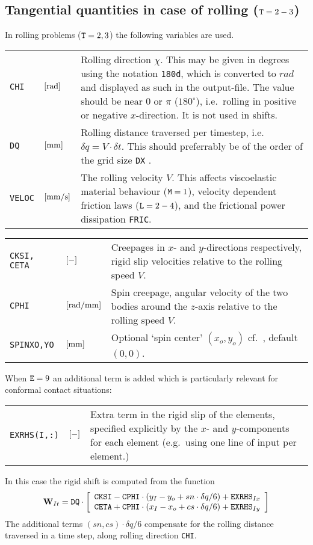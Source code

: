\documentclass[12pt]{report}
\newenvironment{inputvars}{\vspace{0.4\baselineskip}%

\begin{tabular}{>{\raggedright}p{22mm}p{19mm}p{113mm}}}{
\end{tabular}

}
\newcommand{\inpvar}[3]{{\small\tt #1} & $#2$ & #3 \\[1ex]}
\newcommand{\inpbreak}{\end{inputvars}\begin{inputvars}}
\begin{document}
\subsection{Tangential quantities in case of rolling \texorpdfstring{(${\tt
        T}=2-3$)}{}}
\label{sec:kincns_roll}

In rolling problems (${\tt T}=2,3$) the following variables are used.
\begin{inputvars}
\inpvar{CHI}{\bunit{rad}}{Rolling direction $\chi$. This may be given in
        degrees using the notation {\tt 180d}, which is converted to
        $\unit{rad}$ and displayed as such in the output-file. The value
        should be near $0$ or $\pi$ ($180^\circ$), i.e.\ rolling in
        positive or negative $x$-direction. It is not used in shifts.}
\inpvar{DQ}{\bunit{mm}}{Rolling distance traversed per timestep, i.e.\
        $\delta q=V\cdot\delta t$. This should preferrably be of the
        order of the grid size {\tt DX} \cite{Wekken2017a-wiggles}.}
\inpvar{VELOC}{\bunit{mm/s}}{The rolling velocity $V$. This affects
        viscoelastic material behaviour (${\tt M}=1$), velocity dependent
        friction laws (${\tt L}=2-4$), and the frictional power dissipation
        {\tt FRIC}.}
\inpbreak
\inpvar{CKSI, CETA}{\bunit{-}}{Creepages in $x$- and $y$-directions
        respectively, rigid slip velocities relative to the rolling speed
        $V$.}
\inpvar{CPHI}{\bunit{rad/mm}}{Spin creepage, angular velocity of the two
        bodies around the $z$-axis relative to the rolling speed $V$.}
\inpvar{SPINXO,YO}{\bunit{mm}}{Optional `spin center' $(x_o,y_o)$ cf.\
        \cite{Vollebregt2018a-sdec}, default $(0,0)$.}
\end{inputvars}
When ${\tt E}=9$ an additional term is added which is particularly relevant
for conformal contact situations:
\begin{inputvars}
\inpvar{EXRHS(I,:)}{\bunit{-}}{Extra term in the rigid slip of the elements,
        specified explicitly by the $x$- and $y$-components for each
        element (e.g.\ using one line of input per element.)}
\end{inputvars}
In this case the rigid shift is computed from the function
\begin{equation}\label{eq:rig_shift_roll}
 \vec{W}_{It} = {\tt DQ} \cdot \left[
        \begin{array}{l}
        {\tt CKSI} - {\tt CPHI} \cdot (y_I-y_o+sn\cdot\delta q/6)
                + {\tt EXRHS}_{Ix}  \\
        {\tt CETA} + {\tt CPHI} \cdot (x_I-x_o+cs\cdot\delta q/6)
                + {\tt EXRHS}_{Iy}
        \end{array} \right]
\end{equation}
The additional terms $(sn,cs)\cdot\delta q/6$ compensate for the rolling
distance traversed in a time step, along rolling direction {\tt CHI}.
\end{document}
